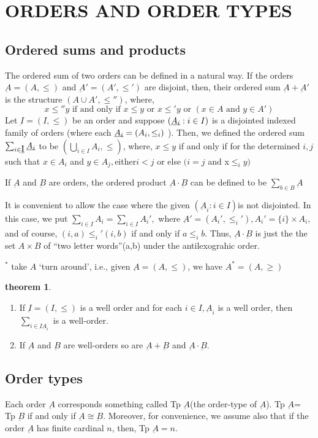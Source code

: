 \documentclass[a4paper,11pt]{article}%
\theoremstyle{remark}
\theoremstyle{definition}
\newtheorem{theorem}{theorem}[section]
\theoremstyle{definition}
\theoremstyle{plain}
\theoremstyle{definition}
\begin{document}
\section{ORDERS AND ORDER TYPES}
\subsection{Ordered sums and products}
The ordered sum of two orders can be defined in a natural way. If 
the orders $\underbar{A}=(A,\leq)$ and $\underbar{A}'=(A',\leq')$ are disjoint,
then, their ordered sum $\underbar{A}+\underbar{A}'$ is the structure $(A\cup A',\leq'')$,
where, 
\[x\leq''y \text{ if and only if } x\leq y \text{ or } x\leq'y \text{ or }(x\in A \text{ and } y\in A')\]
Let $\underbar{I}=(I,\leq)$ 
be an order and suppose 
$(\underbar{$A_i$}:i\in I)$
is a disjointed indexed family of orders (where each 
$\underbar{$A_i$}=(A_i,\leq_i)$
).
Then, we defined the ordered sum 
$\sum_{i\in \underbar{I}}\underbar{$A_i$}$
 to be 
$(\bigcup_{i\in I}A_i,\leq)$,
where, 
$x\leq y$ if and only if for the determined $i,j $such that
$x\in A_i $ and $y\in A_j,$either$ i<j $ or else $(i=j $ and x$\leq_i y)$

If $\underbar{A}$ and $\underbar{B}$ are orders, the ordered product $\underbar{A}\cdot\underbar{B}$
can be defined to be $\sum_{b\in B}\underbar{A}$

It is convenient to allow the case where the given $(\underbar{A}_i:i\in I)$is not disjointed.
In this case, we put $\sum_{i\in \underbar{I}}A_i=\sum_{i\in \underbar{I}}A_i',$ where $\underbar{A}'=(A_i',\leq_i'),A_i'=\{i\}\times A_i,$
and of course, $(i,a)\leq_i'(i,b)$ if and only if $a\leq_i b$. Thus, $\underbar{A}\cdot\underbar{B}$ is just the
the set $A\times B$ of ``two letter words''(a,b) under the antilexograhic order.

$^*$ take $A$ `turn around', i.e., given $\underbar{A}=(A,\leq)$, we have $A^*=(A,\geq)$
\begin{theorem}
    \begin{enumerate}
        \item If $\underbar{I}=(I,\leq)$ is a well order and for each $i\in I,\underbar{A}_i$ is 
        a well order, then $\sum_{i\in \underbar{I}\underbar{A}_i}$ is a well-order.
        \item If $\underbar{A}$ and $\underbar{B}$ are well-orders so are $\underbar{A}+\underbar{B}$ and $\underbar{A}\cdot\underbar{B}$.
    \end{enumerate}
\end{theorem}
\subsection{Order types}
Each order $\underbar{A}$ corresponds something called Tp $\underbar{A}$(the order-type of $\underbar{A}$).
Tp $\underbar{A}$= Tp $\underbar{B}$ if and only if $\underbar{A}\cong\underbar{B}$. Moreover, 
for convenience, we assume also that if the order $\underbar{A}$ has finite cardinal $n$, then, Tp $\underbar{A}=n$.
\end{document}
